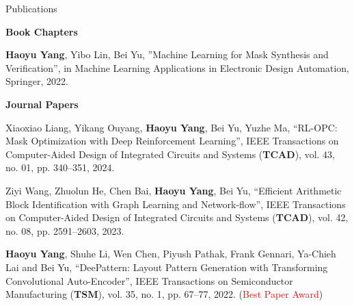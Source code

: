 \clearpage
\begin{rSection}{Publications}
	
\iftrue



\textbf{Book Chapters}
\begin{description}[font=\normalfont]
	
	\item[{[B1]}]{
		\textbf{Haoyu Yang}, Yibo Lin, Bei Yu,
		''Machine Learning for Mask Synthesis and Verification'', 
		in Machine Learning Applications in Electronic Design Automation,
		Springer, 2022.
	}
	
\end{description}


\textbf{Journal Papers}
\begin{description}[font=\normalfont]
	
\item[{[J17]}]{
	Xiaoxiao Liang, Yikang Ouyang, \textbf{Haoyu Yang}, Bei Yu, Yuzhe Ma,
	``RL-OPC: Mask Optimization with Deep Reinforcement Learning'', 
	 IEEE Transactions on Computer-Aided Design of Integrated Circuits and Systems (\textbf{TCAD}), vol. 43, no. 01, pp. 340–351, 2024.
}
	
\item[{[J16]}]{
	Ziyi Wang, Zhuolun He, Chen Bai, \textbf{Haoyu Yang}, Bei Yu,
	``Efficient Arithmetic Block Identification with Graph Learning and Network-flow'', 
	IEEE Transactions on Computer-Aided Design of Integrated Circuits and Systems (\textbf{TCAD}), vol. 42, no. 08, pp. 2591–2603, 2023.
}	


\item[{[J15]}]{
	\textbf{Haoyu Yang}, Shuhe Li, Wen Chen, Piyush Pathak, Frank Gennari, Ya-Chieh Lai and Bei Yu, ``DeePattern: Layout Pattern Generation with Transforming Convolutional Auto-Encoder'',
	IEEE Transactions on Semiconductor Manufacturing (\textbf{TSM}), vol. 35, no. 1, pp. 67–77, 2022. (\textcolor{red}{Best Paper Award})
}


\end{description}
\end{rSection}
